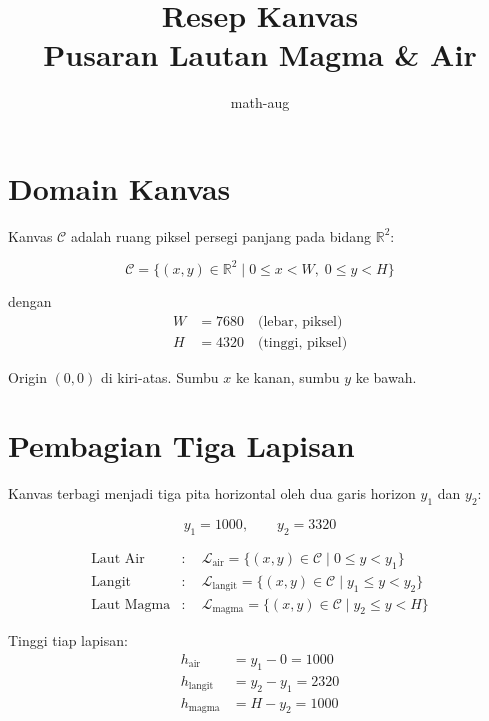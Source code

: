 \documentclass[11pt]{article}
\title{Resep Kanvas \\ \large Pusaran Lautan Magma \& Air}
\author{math-aug}
\date{}
\begin{document}
\maketitle

\section{Domain Kanvas}

Kanvas $\mathcal{C}$ adalah ruang piksel persegi panjang pada bidang
$\mathbb{R}^2$:

\begin{equation}
\mathcal{C} = \bigl\{ (x, y) \in \mathbb{R}^2 \;\big|\; 0 \le x < W,\; 0 \le y < H \bigr\}
\end{equation}

dengan
\begin{align}
W &= 7680 \quad \text{(lebar, piksel)} \\
H &= 4320 \quad \text{(tinggi, piksel)}
\end{align}

Origin $(0,0)$ di kiri-atas. Sumbu $x$ ke kanan, sumbu $y$ ke bawah.

\section{Pembagian Tiga Lapisan}

Kanvas terbagi menjadi tiga pita horizontal oleh dua garis horizon
$y_1$ dan $y_2$:

\begin{equation}
y_1 = 1000, \qquad y_2 = 3320
\end{equation}

\begin{align}
\text{Laut Air}   &:\quad \mathcal{L}_{\text{air}}   = \bigl\{ (x,y) \in \mathcal{C} \;\big|\; 0 \le y < y_1 \bigr\} \\
\text{Langit}     &:\quad \mathcal{L}_{\text{langit}}= \bigl\{ (x,y) \in \mathcal{C} \;\big|\; y_1 \le y < y_2 \bigr\} \\
\text{Laut Magma} &:\quad \mathcal{L}_{\text{magma}} = \bigl\{ (x,y) \in \mathcal{C} \;\big|\; y_2 \le y < H \bigr\}
\end{align}

Tinggi tiap lapisan:
\begin{align}
h_{\text{air}}   &= y_1 - 0     = 1000 \\
h_{\text{langit}}&= y_2 - y_1   = 2320 \\
h_{\text{magma}} &= H   - y_2   = 1000
\end{align}
\end{document}
